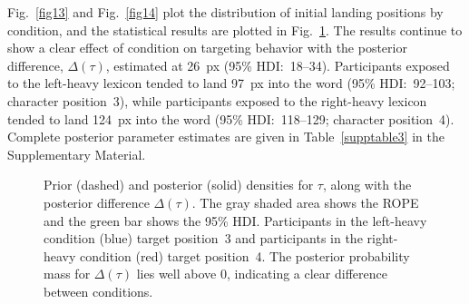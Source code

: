 \documentclass[doc,biblatex,floatsintext]{apa7}
\begin{document}
Fig.~\ref{fig13} and Fig.~\ref{fig14} plot the distribution of initial landing positions by condition, and the statistical results are plotted in Fig.~\ref{fig15}. The results continue to show a clear effect of condition on targeting behavior with the posterior difference, $\Delta(\tau)$, estimated at 26~px (95\% HDI:~18--34). Participants exposed to the left-heavy lexicon tended to land 97~px into the word (95\% HDI:~92--103; character position~3), while participants exposed to the right-heavy lexicon tended to land 124~px into the word (95\% HDI:~118--129; character position~4). Complete posterior parameter estimates are given in Table~\ref{supptable3} in the Supplementary Material.

\begin{figure}
\vspace*{2pt}
\caption{Prior (dashed) and posterior (solid) densities for $\tau$, along with the posterior difference $\Delta(\tau)$. The gray shaded area shows the ROPE and the green bar shows the 95\% HDI. Participants in the left-heavy condition (blue) target position~3 and participants in the right-heavy condition (red) target position~4. The posterior probability mass for $\Delta(\tau)$ lies well above 0, indicating a clear difference between conditions.}
\label{fig15}
\end{figure}
\end{document}
